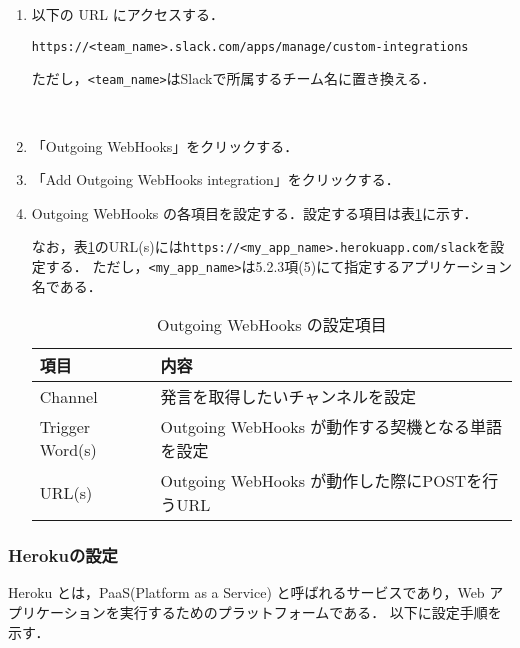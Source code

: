 \documentclass[12pt]{jsarticle}
\begin{document}
\begin{enumerate}
  \item 以下の URL にアクセスする．

    \verb|https://<team_name>.slack.com/apps/manage/custom-integrations|

    ただし，\verb|<team_name>|はSlackで所属するチーム名に置き換える．
    
　\item 「Outgoing WebHooks」をクリックする．
  \item 「Add Outgoing WebHooks integration」をクリックする．
  \item Outgoing WebHooks の各項目を設定する．設定する項目は表\ref{tab:config}に示す．

なお，表\ref{tab:config}のURL(s)には\verb|https://<my_app_name>.herokuapp.com/slack|を設定する．
ただし，\verb|<my_app_name>|は5.2.3項(5)にて指定するアプリケーション名である．
 
\begin{table}[tb]
  \begin{center}
    \caption{Outgoing WebHooks の設定項目}\label{tab:config}
    \begin{tabular}{l|l}
      \hline\hline
      \multicolumn{1}{l|}{項目} & \multicolumn{1}{l}{内容} \\
      \hline
      Channel         & 発言を取得したいチャンネルを設定 \\
      Trigger Word(s) & Outgoing WebHooks が動作する契機となる単語を設定 \\
      URL(s)          & Outgoing WebHooks が動作した際にPOSTを行うURL \\
      \hline
    \end{tabular}
  \end{center}
\end{table}

\end{enumerate}

\subsubsection{Herokuの設定}
Heroku とは，PaaS(Platform as a Service) と呼ばれるサービスであり，Web アプリケーションを実行するためのプラットフォームである．
以下に設定手順を示す．
\end{document}
